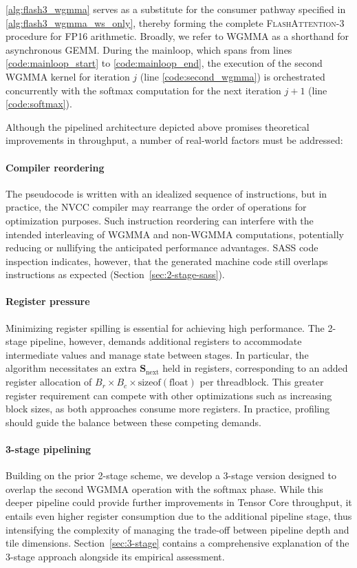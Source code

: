 \begin{algorithm}[H]
\begin{algorithmic}[1]
\cref{alg:flash3_wgmma} serves as a substitute for the consumer pathway specified in \cref{alg:flash3_wgmma_ws_only}, thereby forming the complete \textsc{FlashAttention-3} procedure for FP16 arithmetic. Broadly, we refer to WGMMA as a shorthand for asynchronous GEMM. During the mainloop, which spans from lines \ref{code:mainloop_start} to \ref{code:mainloop_end}, the execution of the second WGMMA kernel for iteration $j$ (line \ref{code:second_wgmma}) is orchestrated concurrently with the softmax computation for the next iteration $j+1$ (line \ref{code:softmax}).

Although the pipelined architecture depicted above promises theoretical improvements in throughput, a number of real-world factors must be addressed:
\paragraph{Compiler reordering} The pseudocode is written with an idealized sequence of instructions, but in practice, the NVCC compiler may rearrange the order of operations for optimization purposes. Such instruction reordering can interfere with the intended interleaving of WGMMA and non-WGMMA computations, potentially reducing or nullifying the anticipated performance advantages. SASS code inspection indicates, however, that the generated machine code still overlaps instructions as expected (Section~\ref{sec:2-stage-sass}).
\paragraph{Register pressure} Minimizing register spilling is essential for achieving high performance. The 2-stage pipeline, however, demands additional registers to accommodate intermediate values and manage state between stages. In particular, the algorithm necessitates an extra $\mathbf{S}_{\mathrm{next}}$ held in registers, corresponding to an added register allocation of $B_r \times B_c \times \text{sizeof}(\text{float})$ per threadblock. This greater register requirement can compete with other optimizations such as increasing block sizes, as both approaches consume more registers. In practice, profiling should guide the balance between these competing demands.
\paragraph{3-stage pipelining} Building on the prior 2-stage scheme, we develop a 3-stage version designed to overlap the second WGMMA operation with the softmax phase. While this deeper pipeline could provide further improvements in Tensor Core throughput, it entails even higher register consumption due to the additional pipeline stage, thus intensifying the complexity of managing the trade-off between pipeline depth and tile dimensions. Section~\cref{sec:3-stage} contains a comprehensive explanation of the 3-stage approach alongside its empirical assessment.


\end{algorithmic}
\end{algorithm}
